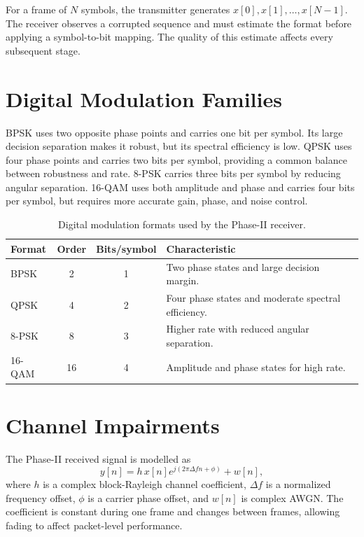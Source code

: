 \documentclass[12pt,twoside,openright]{report}
\begin{document}
For a frame of $N$ symbols, the transmitter generates
$x[0],x[1],\ldots,x[N-1]$. The receiver observes a corrupted sequence and
must estimate the format before applying a symbol-to-bit mapping. The
quality of this estimate affects every subsequent stage.

\section{Digital Modulation Families}
BPSK uses two opposite phase points and carries one bit per symbol. Its large
decision separation makes it robust, but its spectral efficiency is low.
QPSK uses four phase points and carries two bits per symbol, providing a
common balance between robustness and rate. 8-PSK carries three bits per
symbol by reducing angular separation. 16-QAM uses both amplitude and phase
and carries four bits per symbol, but requires more accurate gain, phase,
and noise control.

\begin{table}[htbp]
\centering
\small
\caption{Digital modulation formats used by the Phase-II receiver.}
\label{tab:modulationfamilies}
\begin{tabular}{p{} c c p{}}
\toprule
\textbf{Format} & \textbf{Order} & \textbf{Bits/symbol} & \textbf{Characteristic}\\
\midrule
BPSK & 2 & 1 & Two phase states and large decision margin.\\
QPSK & 4 & 2 & Four phase states and moderate spectral efficiency.\\
8-PSK & 8 & 3 & Higher rate with reduced angular separation.\\
16-QAM & 16 & 4 & Amplitude and phase states for high rate.\\
\bottomrule
\end{tabular}
\end{table}

\section{Channel Impairments}
The Phase-II received signal is modelled as
\begin{equation}
y[n]=h\,x[n]e^{j(2\pi\Delta f n+\phi)}+w[n],
\end{equation}
where $h$ is a complex block-Rayleigh channel coefficient, $\Delta f$ is a
normalized frequency offset, $\phi$ is a carrier phase offset, and $w[n]$
is complex AWGN. The coefficient is constant during one frame and changes
between frames, allowing fading to affect packet-level performance.
\end{document}
